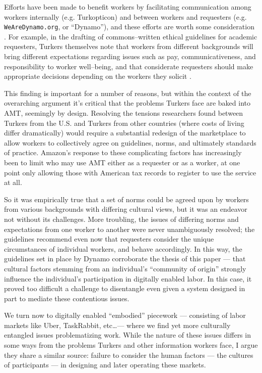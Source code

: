 \documentclass[11pt]{article}
\begin{document}
Efforts have been made to benefit workers by facilitating communication among workers internally (e.g. Turkopticon) and between workers and requesters (e.g. \texttt{WeAreDynamo.org}, or ``Dynamo''), and these efforts are worth some consideration \cite{turkopticon,dynamo}.
For example, in the drafting of commons--written ethical guidelines for academic requesters,
Turkers themselves note that workers from different backgrounds will bring different expectations regarding issues such as pay, communicativeness, and responsibility to worker well--being,
and that considerate requesters should make appropriate decisions depending on the workers they solicit
\cite{dynamo}.

This finding is important for a number of reasons,
but within the context of the overarching argument it's critical that
the problems Turkers face are baked into AMT, seemingly by design.
Resolving the tensions researchers found between Turkers from the U.S. and Turkers from other countries
(where costs of living differ dramatically)
would require a substantial redesign of the marketplace to allow workers to collectively agree on 
guidelines,
norms,
and ultimately standards of practice.
Amazon's response to these complicating factors has increasingly been to limit who may use AMT either as a requester or as a worker, at one point only allowing those with American tax records to register to use the service at all.


So it was empirically true that
a set of norms could be agreed upon by workers from various backgrounds with differing cultural views,
but it was an endeavor not without its challenges.
More troubling, the issues of differing norms and expectations from one worker to another were never unambiguously resolved;
the guidelines recommend even now that requesters consider the unique circumstances of individual workers, and behave accordingly.
In this way, the guidelines set in place by Dynamo corroborate the thesis of this paper
--- that cultural factors stemming from an individual's ``community of origin'' strongly influence the individual's participation in digitally enabled labor.
In this case, it proved too difficult a challenge to disentangle even given a system designed in part to mediate these contentious issues.


We turn now to digitally enabled ``embodied'' piecework
--- consisting of labor markets like Uber, TaskRabbit, etc\dots ---
where we find yet more culturally entangled issues problematizing work.
While the nature of these issues differs in some ways from the problems Turkers and other information workers face,
I argue they share a similar source: failure to consider the human factors
--- the cultures of participants ---
in designing and later operating these markets.
\end{document}
